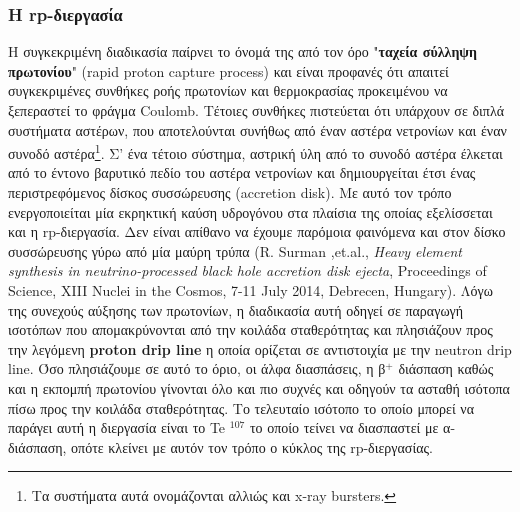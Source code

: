 \subsubsection{Η rp-διεργασία}
Η συγκεκριμένη διαδικασία παίρνει το όνομά της από τον όρο "\textbf{ταχεία σύλληψη πρωτονίου}" (rapid proton capture process) και είναι προφανές ότι απαιτεί συγκεκριμένες συνθήκες ροής πρωτονίων και θερμοκρασίας προκειμένου να ξεπεραστεί το φράγμα Coulomb. Τέτοιες συνθήκες πιστεύεται ότι υπάρχουν σε διπλά συστήματα αστέρων, που αποτελούνται συνήθως από έναν αστέρα νετρονίων και έναν συνοδό αστέρα\footnote{Τα συστήματα αυτά ονομάζονται αλλιώς και x-ray bursters.}. Σ' ένα τέτοιο σύστημα, αστρική ύλη από το συνοδό αστέρα έλκεται από το έντονο βαρυτικό πεδίο του αστέρα νετρονίων και δημιουργείται έτσι ένας περιστρεφόμενος δίσκος συσσώρευσης (accretion disk). Με αυτό τον τρόπο ενεργοποιείται μία εκρηκτική καύση υδρογόνου στα πλαίσια της οποίας εξελίσσεται και η rp-διεργασία. Δεν είναι απίθανο να έχουμε παρόμοια φαινόμενα και στον δίσκο συσσώρευσης γύρω από μία μαύρη τρύπα (R. Surman ,et.al., \textit{Heavy element synthesis in neutrino-processed black hole accretion disk ejecta}, Proceedings of Science, XIII Nuclei in the Cosmos, 7-11 July 2014, Debrecen, Hungary).
Λόγω της συνεχούς αύξησης των πρωτονίων, η διαδικασία αυτή οδηγεί σε παραγωγή ισοτόπων που απομακρύνονται από την κοιλάδα σταθερότητας και πλησιάζουν προς την λεγόμενη \textbf{proton drip line} η οποία ορίζεται σε αντιστοιχία με την neutron drip line. Όσο πλησιάζουμε σε αυτό το όριο, οι άλφα διασπάσεις, η β$^{+}$ διάσπαση καθώς και η εκπομπή πρωτονίου γίνονται όλο και πιο συχνές και οδηγούν τα ασταθή ισότοπα πίσω προς την κοιλάδα σταθερότητας. Το τελευταίο ισότοπο το οποίο μπορεί να παράγει αυτή η διεργασία είναι το Te $^{107}$ το οποίο τείνει να διασπαστεί με α-διάσπαση, οπότε κλείνει με αυτόν τον τρόπο ο κύκλος της rp-διεργασίας.
